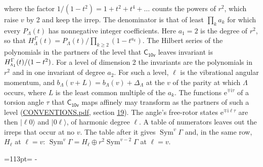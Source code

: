\documentclass[10pt,a4paper]{article}
\newcommand{\needspace}[1]{\par\penalty-100\begingroup\dimen0=#1\relax\dimen2=\pagegoal
  \advance\dimen2-\pagetotal\ifdim\dimen0>\dimen2\relax\ifdim\dimen2>0pt\vfil\break\fi\fi
  \endgroup}
\numberwithin{equation}{section}
\newcommand{\grp}[1]{\mathsf{#1}}
\newcommand{\irr}[1]{\text{\normalfont\scshape #1}}
\newcommand{\iunit}{\mathrm{i}}
\newcommand{\expe}{\mathrm{e}}
\newcommand{\occ}[1]{\lvert #1\rangle}
\begin{document}
where the factor $1/(1 - t^2) = 1 + t^2 + t^4 + \dots$ counts the powers of $r^2$, which raise $v$ by 2 and keep the irrep. The denominator is that of least $\prod_k a_k$ for which every $P_\Lambda(t)$ has nonnegative integer coefficients. Here $a_1 = 2$ is the degree of $r^2$, so that $H^{\Gamma}_\Lambda(t) = P_\Lambda(t)/\prod_{k\ge2}(1 - t^{a_k})$. The Hilbert series of the polynomials in the partners of the level that $\grp{C_{10v}}$ leaves invariant is $H^{\Gamma}_{\irr{a}_{1}}(t)/(1 - t^2)$. For a level of dimension 2 the invariants are the polynomials in $r^2$ and in one invariant of degree $a_2$. \label{n:index.overtone.period}\label{n:index.increment.unitary}For such a level, $\ell$ is the vibrational angular momentum, and $b_\Lambda(v + L) = b_\Lambda(v) + \Delta_\Lambda$ at the $v$ of the parity at which $\Lambda$ occurs, where $L$ is the least common multiple of the $a_k$. \label{n:local.torsion.angle}The functions $\expe^{\mp\iunit\tau}$ of a torsion angle $\tau$ that $\grp{C_{10v}}$ maps affinely may transform as the partners of such a level (\href{../../CONVENTIONS.pdf}{CONVENTIONS.pdf}, section \href{../../CONVENTIONS.pdf\#conv.19}{19}). The angle's free-rotor states $\expe^{\mp\iunit\ell\tau}$ are then $\occ{\ell 0}$ and $\occ{0 \ell}$, of harmonic degree $\ell$. A table of numerators leaves out the irreps that occur at no $v$. The table after it gives $\operatorname{Sym}^{v}\Gamma$ and, in the same row, $H_\ell$ at $\ell = v$: $\operatorname{Sym}^{v}\Gamma = H_\ell \oplus r^2\operatorname{Sym}^{v-2}\Gamma$ at $\ell = v$.
\needspace{113pt}
\end{document}
